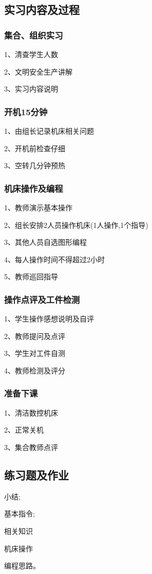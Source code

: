 \subsection{实习内容及过程}

\subsubsection{集合、组织实习}
1、清查学生人数

2、文明安全生产讲解

3、实习内容说明
\subsubsection{开机15分钟}
1、由组长记录机床相关问题

2、开机前检查仔细

3、空转几分钟预热
\subsubsection{机床操作及编程}
1、教师演示基本操作

2、组长安排2人员操作机床(1人操作,1个指导)

3、其他人员自选图形编程

4、每人操作时间不得超过2小时

5、教师巡回指导
\subsubsection{操作点评及工件检测}
1、学生操作感想说明及自评

2、教师提问及点评

3、学生对工件自测

4、教师检测及评分
\subsubsection{准备下课}
1、清洁数控机床

2、正常关机

3、集合教师点评

\subsection{练习题及作业}
\begin{compactenum}[1、]
	\item 小结;
	\item 基本指令;
	\item 相关知识
	\item 机床操作
	\item 编程思路。
\end{compactenum}

